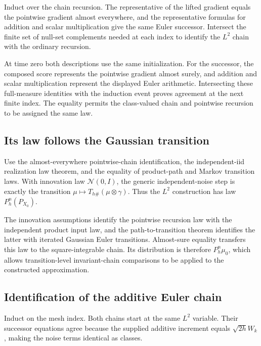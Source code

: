 \documentclass[11pt,a4paper]{report}
\begin{document}
Induct over the chain recursion. The representative of the lifted gradient equals the pointwise gradient almost everywhere, and the representative formulas for addition and scalar multiplication give the same Euler successor. Intersect the finite set of null-set complements needed at each index to identify the \(L^2\) chain with the ordinary recursion.



At time zero both descriptions use the same initialization. For the successor, the composed score represents the pointwise gradient almost surely, and addition and scalar multiplication represent the displayed Euler arithmetic. Intersecting these full-measure identities with the induction event proves agreement at the next finite index. The equality permits the class-valued chain and pointwise recursion to be assigned the same law.

\subsection{\texorpdfstring{Its law follows the Gaussian transition}{Its law follows the Gaussian transition}}
\label{report-step-UnadjustedLangevin-GibbsStationarity-lean-2}


Use the almost-everywhere pointwise-chain identification, the independent-iid realization law theorem, and the equality of product-path and Markov transition laws. With innovation law \(\mathcal N(0,I)\), the generic independent-noise step is exactly the transition \(\mu\mapsto T_{h\#}(\mu\otimes\gamma)\). Thus the \(L^2\) construction has law \(P_h^n(P_{X_0})\).



The innovation assumptions identify the pointwise recursion law with the independent product input law, and the path-to-transition theorem identifies the latter with iterated Gaussian Euler transitions. Almost-sure equality transfers this law to the square-integrable chain. Its distribution is therefore \(P_h^n\mu_0\), which allows transition-level invariant-chain comparisons to be applied to the constructed approximation.

\subsection{\texorpdfstring{Identification of the additive Euler chain}{Identification of the additive Euler chain}}
\label{report-step-UnadjustedLangevin-GibbsStationarity-lean-3}


Induct on the mesh index. Both chains start at the same \(L^2\) variable. Their successor equations agree because the supplied additive increment equals \(\sqrt{2h}W_k\), making the noise terms identical as classes.
\end{document}
